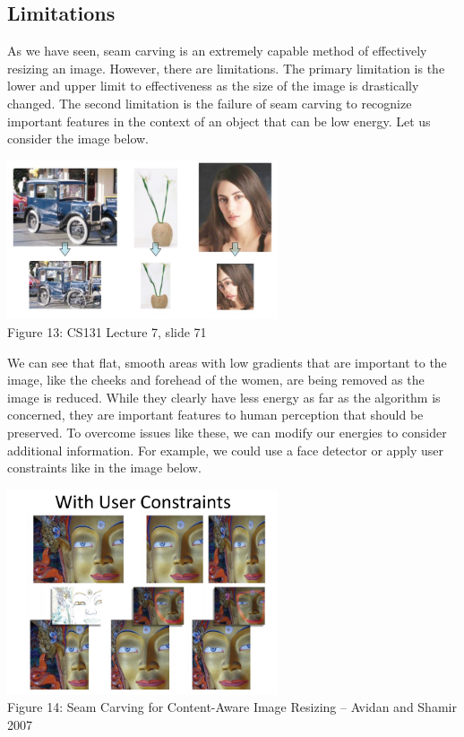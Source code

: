 \documentclass{article}
\begin{document}
\subsection{Limitations}
As we have seen, seam carving is an extremely capable method of effectively resizing an image. However, there are limitations. The primary limitation is the lower and upper limit to effectiveness as the size of the image is drastically changed.  The second limitation is the failure of seam carving to recognize important features in the context of an object that can be low energy. Let us consider the image below.
\begin{center}
\includegraphics[width=8cm]{seam_carving_limitations.JPG} \\
Figure 13: CS131 Lecture 7, slide 71
\end{center}

We can see that flat, smooth areas with low gradients that are important to the image, like the cheeks and forehead of the women, are being removed as the image is reduced. While they clearly have less energy as far as the algorithm is concerned, they are important features to human perception that should be preserved. To overcome issues like these, we can modify our energies to consider additional information. For example, we could use a face detector or apply user constraints like in the image below.

\begin{center}
\includegraphics[width=8cm]{user_constraints.PNG} \\
Figure 14: Seam Carving	for	Content-Aware Image	Resizing – Avidan and Shamir	2007
\end{center}
%
\end{document}
